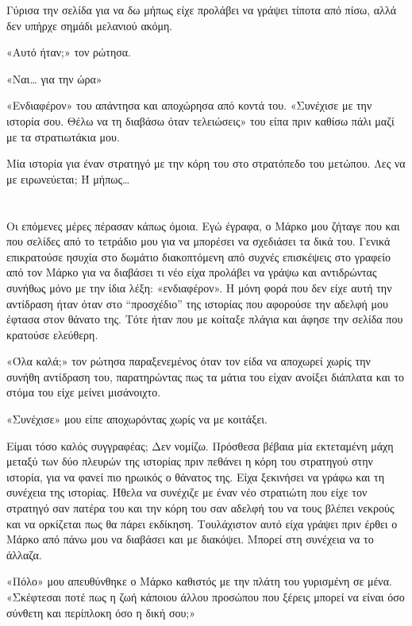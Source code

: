 \documentclass[12pt,twoside, openany]{book}
\begin{document}
Γύρισα την σελίδα για να δω μήπως είχε προλάβει να γράψει τίποτα από πίσω, αλλά δεν υπήρχε σημάδι μελανιού ακόμη.

«Αυτό ήταν;» τον ρώτησα.

«Ναι… για την ώρα»

«Ενδιαφέρον» του απάντησα και αποχώρησα από κοντά του. «Συνέχισε με την ιστορία σου. Θέλω να τη διαβάσω όταν τελειώσεις» του είπα πριν καθίσω πάλι μαζί με τα στρατιωτάκια μου.

Μία ιστορία για έναν στρατηγό με την κόρη του στο στρατόπεδο του μετώπου. Λες να με ειρωνεύεται; Ή μήπως…


\chapter{}

Οι επόμενες μέρες πέρασαν κάπως όμοια. Εγώ έγραφα, ο Μάρκο μου ζήταγε που και που σελίδες από το τετράδιο μου για να μπορέσει να σχεδιάσει τα δικά του. Γενικά επικρατούσε ησυχία στο δωμάτιο διακοπτόμενη από συχνές επισκέψεις στο γραφείο από τον Μάρκο για να διαβάσει τι νέο είχα προλάβει να γράψω και αντιδρώντας συνήθως μόνο με την ίδια λέξη: «ενδιαφέρον». Η μόνη φορά που δεν είχε αυτή την αντίδραση ήταν όταν στο “προσχέδιο” της ιστορίας που αφορούσε την αδελφή μου έφτασα στον θάνατο της. Τότε ήταν που με κοίταξε πλάγια και άφησε την σελίδα που κρατούσε ελεύθερη. 

«Όλα καλά;» τον ρώτησα παραξενεμένος όταν τον είδα να αποχωρεί χωρίς την συνήθη αντίδραση του, παρατηρώντας πως τα μάτια του είχαν ανοίξει διάπλατα και το στόμα του είχε μείνει μισάνοιχτο.

«Συνέχισε» μου είπε αποχωρόντας χωρίς να με κοιτάξει.

Είμαι τόσο καλός συγγραφέας; Δεν νομίζω. Πρόσθεσα βέβαια μία εκτεταμένη μάχη μεταξύ των δύο πλευρών της ιστορίας πριν πεθάνει η κόρη του στρατηγού στην ιστορία, για να φανεί πιο ηρωικός ο θάνατος της. Είχα ξεκινήσει να γράφω και τη συνέχεια της ιστορίας. Ήθελα να συνέχιζε με έναν νέο στρατιώτη που είχε τον στρατηγό σαν πατέρα του και την κόρη του σαν αδελφή του να τους βλέπει νεκρούς και να ορκίζεται πως θα πάρει εκδίκηση. Τουλάχιστον αυτό είχα γράψει πριν έρθει ο Μάρκο από πάνω μου να διαβάσει και με διακόψει. Μπορεί στη συνέχεια να το άλλαζα.

«Πόλο» μου απευθύνθηκε ο Μάρκο καθιστός με την πλάτη του γυρισμένη σε μένα. «Σκέφτεσαι ποτέ πως η ζωή κάποιου άλλου προσώπου που ξέρεις μπορεί να είναι όσο σύνθετη και περίπλοκη όσο η δική σου;»
\end{document}
